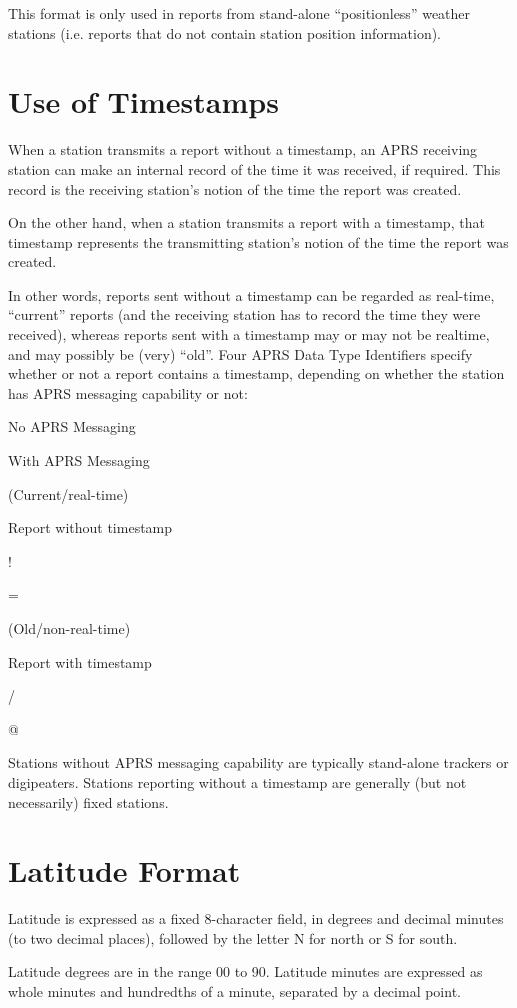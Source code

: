 This format is only used in reports from stand-alone “positionless” weather
stations (i.e. reports that do not contain station position information).


\section{Use of Timestamps}

When a station transmits a report without a timestamp, an APRS receiving
station can make an internal record of the time it was received, if required.
This record is the receiving station’s notion of the time the report was
created.

On the other hand, when a station transmits a report with a timestamp, that
timestamp represents the transmitting station’s notion of the time the report
was created.

In other words, reports sent without a timestamp can be regarded as real-time,
“current” reports (and the receiving station has to record the time they were
received), whereas reports sent with a timestamp may or may not be realtime, and may possibly be (very) “old”.
Four APRS Data Type Identifiers specify whether or not a report contains a
timestamp, depending on whether the station has APRS messaging capability
or not:

No APRS
Messaging

With APRS
Messaging

(Current/real-time)

Report without timestamp

!

=

(Old/non-real-time)

Report with timestamp

/

@

Stations without APRS messaging capability are typically stand-alone
trackers or digipeaters. Stations reporting without a timestamp are generally
(but not necessarily) fixed stations.

\section{Latitude Format}

Latitude is expressed as a fixed 8-character field, in degrees and decimal
minutes (to two decimal places), followed by the letter N for north or S for
south.

Latitude degrees are in the range 00 to 90. Latitude minutes are expressed as
whole minutes and hundredths of a minute, separated by a decimal point.

